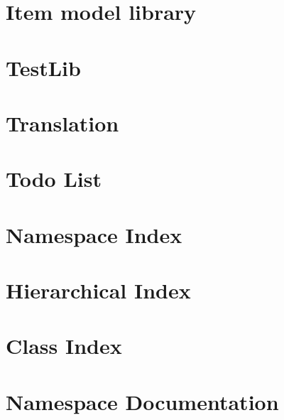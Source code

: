 \documentclass[twoside]{book}
\newcommand{\+}{\discretionary{\mbox{\scriptsize$\hookleftarrow$}}{}{}}
\begin{document}
\chapter{Item model library}
\label{libs_ItemModel}
\hypertarget{libs_ItemModel}{}

\chapter{Test\+Lib}
\label{libs_TestLib}
\hypertarget{libs_TestLib}{}

\chapter{Translation}
\label{libs_Translation}
\hypertarget{libs_Translation}{}

\chapter{Todo List}
\label{todo}
\hypertarget{todo}{}

\chapter{Namespace Index}

\chapter{Hierarchical Index}

\chapter{Class Index}

\chapter{Namespace Documentation}








\end{document}
